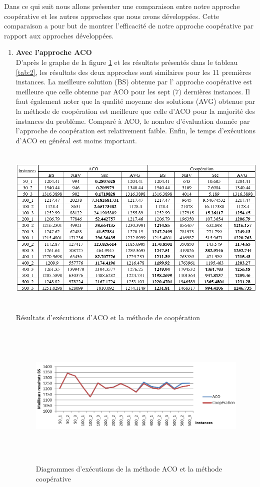 Dans ce qui suit nous allons présenter une comparaison entre notre approche coopérative et les autres approches que nous avons développées. Cette comparaison a pour but de montrer l’efficacité de notre approche coopérative par rapport aux approches développées. 

\begin{enumerate}[label=\alph*)]
	\item \textbf{Avec l’approche ACO}\\
	D’après le graphe de la figure \ref{fig:DEMACOMC} et les résultats présentés dans le tableau \ref{tab:2}, les résultats des deux approches sont similaires pour les 11 premières instances. La meilleure solution (BS) obtenue par l’ approche coopérative  est meilleure que celle obtenue par ACO pour les sept  (7) dernières instances. Il faut également noter que la qualité moyenne des solutions (AVG) obtenue par la méthode de coopération est  meilleure que celle d’ACO pour la majorité des instances du problème. Comparé à ACO, le nombre d’évaluation donnée par  l’approche de coopération est relativement faible. Enfin,  le temps d’exécutions  d'ACO en général est moins important.

\begin{table}[H]
	\includegraphics[width=15cm,height=8cm]{Chap5/t2.png}
	\caption{Résultats d’exécutions d’ACO et la méthode de coopération}
	\label{tab:2}
\end{table}

\begin{figure}[H]
	\centering
	\includegraphics[width=16cm,height=7cm]{Chap5/2.png}
	\caption{Diagrammes d’exécutions de la méthode ACO et la méthode coopérative}
	\label{fig:DEMACOMC}
\end{figure}


\end{enumerate}
